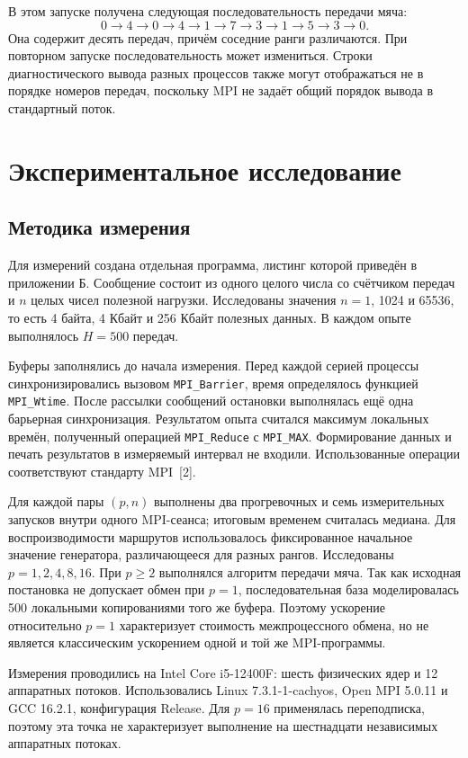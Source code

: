\documentclass[14pt,a4paper]{extarticle}
\begin{document}
В этом запуске получена следующая последовательность передачи мяча:
\[
0\to4\to0\to4\to1\to7\to3\to1\to5\to3\to0.
\]
Она содержит десять передач, причём соседние ранги различаются. При
повторном запуске последовательность может измениться. Строки диагностического
вывода разных процессов также могут отображаться не в порядке номеров
передач, поскольку MPI не задаёт общий порядок вывода в стандартный поток.

\section{Экспериментальное исследование}

\subsection{Методика измерения}

Для измерений создана отдельная программа, листинг которой приведён в
приложении Б. Сообщение состоит из одного целого числа со счётчиком передач и
$n$ целых чисел полезной нагрузки. Исследованы значения $n=1$, 1024 и 65536,
то есть 4 байта, 4 Кбайт и 256 Кбайт полезных данных. В каждом опыте
выполнялось $H=500$ передач.

Буферы заполнялись до начала измерения. Перед каждой серией процессы
синхронизировались вызовом \texttt{MPI\_Barrier}, время определялось функцией
\texttt{MPI\_Wtime}. После рассылки сообщений остановки выполнялась ещё одна
барьерная синхронизация. Результатом опыта считался максимум локальных времён,
полученный операцией \texttt{MPI\_Reduce} с \texttt{MPI\_MAX}. Формирование
данных и печать результатов в измеряемый интервал не входили. Использованные
операции соответствуют стандарту MPI~[2].

Для каждой пары $(p,n)$ выполнены два прогревочных и семь измерительных
запусков внутри одного MPI-сеанса; итоговым временем считалась медиана.
Для воспроизводимости маршрутов использовалось фиксированное начальное
значение генератора, различающееся для разных рангов.
Исследованы $p=1,2,4,8,16$. При $p\geq2$ выполнялся алгоритм передачи мяча.
Так как исходная постановка не допускает обмен при $p=1$, последовательная
база моделировалась 500 локальными копированиями того же буфера. Поэтому
ускорение относительно $p=1$ характеризует стоимость межпроцессного обмена,
но не является классическим ускорением одной и той же MPI-программы.

Измерения проводились на Intel Core i5-12400F: шесть физических ядер и 12
аппаратных потоков. Использовались Linux 7.3.1-1-cachyos, Open MPI 5.0.11 и
GCC 16.2.1, конфигурация Release. Для $p=16$ применялась переподписка, поэтому
эта точка не характеризует выполнение на шестнадцати независимых аппаратных
потоках.
\end{document}
